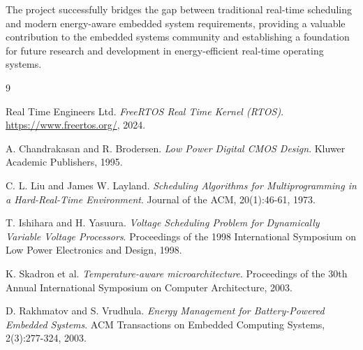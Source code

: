 \documentclass[11pt,a4paper]{article}
\begin{document}
The project successfully bridges the gap between traditional real-time scheduling and modern energy-aware embedded system requirements, providing a valuable contribution to the embedded systems community and establishing a foundation for future research and development in energy-efficient real-time operating systems.


\begin{thebibliography}{9}

Real Time Engineers Ltd.
\textit{FreeRTOS Real Time Kernel (RTOS)}.
\url{https://www.freertos.org/}, 2024.

A. Chandrakasan and R. Brodersen.
\textit{Low Power Digital CMOS Design}.
Kluwer Academic Publishers, 1995.

C. L. Liu and James W. Layland.
\textit{Scheduling Algorithms for Multiprogramming in a Hard-Real-Time Environment}.
Journal of the ACM, 20(1):46-61, 1973.

T. Ishihara and H. Yasuura.
\textit{Voltage Scheduling Problem for Dynamically Variable Voltage Processors}.
Proceedings of the 1998 International Symposium on Low Power Electronics and Design, 1998.

K. Skadron et al.
\textit{Temperature-aware microarchitecture}.
Proceedings of the 30th Annual International Symposium on Computer Architecture, 2003.

D. Rakhmatov and S. Vrudhula.
\textit{Energy Management for Battery-Powered Embedded Systems}.
ACM Transactions on Embedded Computing Systems, 2(3):277-324, 2003.

\end{thebibliography}
\end{document}

